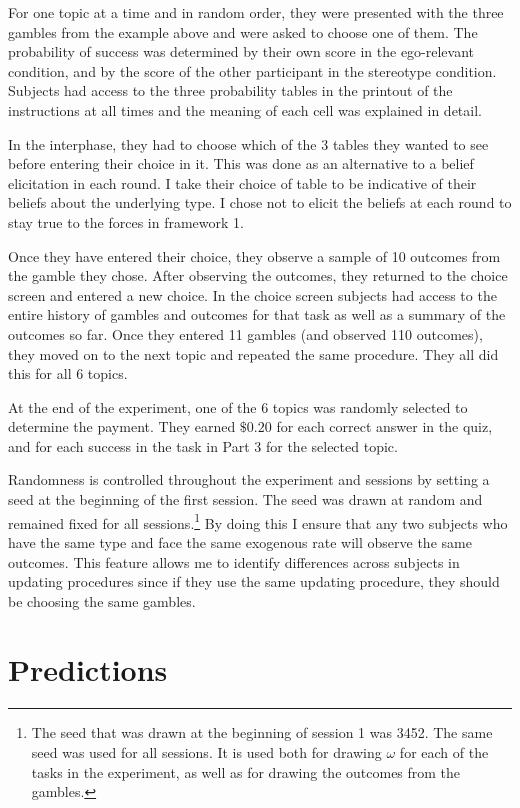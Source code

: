 \documentclass[
  12pt,
]{article}
\begin{document}
For one topic at a time and in random order, they were presented with
the three gambles from the example above and were asked to choose one of
them. The probability of success was determined by their own score in
the ego-relevant condition, and by the score of the other participant in
the stereotype condition. Subjects had access to the three probability
tables in the printout of the instructions at all times and the meaning
of each cell was explained in detail.

In the interphase, they had to choose which of the 3 tables they wanted
to see before entering their choice in it. This was done as an
alternative to a belief elicitation in each round. I take their choice
of table to be indicative of their beliefs about the underlying type. I
chose not to elicit the beliefs at each round to stay true to the forces
in framework 1.

Once they have entered their choice, they observe a sample of 10
outcomes from the gamble they chose. After observing the outcomes, they
returned to the choice screen and entered a new choice. In the choice
screen subjects had access to the entire history of gambles and outcomes
for that task as well as a summary of the outcomes so far. Once they
entered 11 gambles (and observed 110 outcomes), they moved on to the
next topic and repeated the same procedure. They all did this for all 6
topics.

At the end of the experiment, one of the 6 topics was randomly selected
to determine the payment. They earned \(\$0.20\) for each correct answer
in the quiz, and for each success in the task in Part 3 for the selected
topic.

Randomness is controlled throughout the experiment and sessions by
setting a seed at the beginning of the first session. The seed was drawn
at random and remained fixed for all
sessions.\footnote{The seed that was drawn 
at the beginning of session 1 was 3452. The same seed was used for all sessions. It is used both for drawing $\omega$ for each of 
the tasks in the experiment, as well as for drawing the outcomes from the gambles.}
By doing this I ensure that any two subjects who have the same type and
face the same exogenous rate will observe the same outcomes. This
feature allows me to identify differences across subjects in updating
procedures since if they use the same updating procedure, they should be
choosing the same gambles.

\hypertarget{predictions}{%
\section{Predictions}\label{predictions}}
\end{document}
